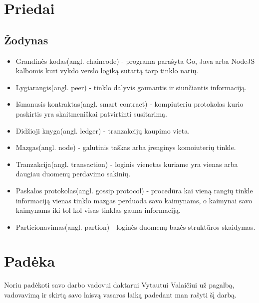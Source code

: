 \documentclass{VUMIFPSkursinis}
\begin{document}
\pagebreak

\section{Priedai}
\thispagestyle{empty} 
\subsection{Žodynas}
\begin{itemize}
	\item{Grandinės kodas(angl. chaincode) - programa parašyta Go, Java arba NodeJS kalbomis kuri vykdo
 verslo logiką sutartą tarp tinklo narių.}
	\item{Lygiarangis(angl. peer) - tinklo dalyvis gaunantis ir siunčiantis informaciją.}
	\item{Išmanusis kontraktas(angl. smart contract) - kompiuteriu protokolas kurio paskirtis yra skaitmeniškai patvirtinti susitarimą.}
	\item{Didžioji knyga(angl. ledger) - tranzakcijų kaupimo vieta.}
	\item{Mazgas(angl. node) - galutinis taškas arba įrenginys komoiuterių tinkle.}
	\item{Tranzakcija(angl. transaction) - loginis vienetas kuriame yra vienas arba daugiau duomenų perdavimo sakinių.}
	\item{Paskalos protokolas(angl. gossip protocol) - procedūra kai vieną rangių tinkle informaciją vienas tinklo mazgas perduoda savo kaimynams, o kaimynai savo kaimynams iki tol kol visas tinklas gauna informaciją.}
	\item{Particionavimas(angl. partion) - loginės duomenų bazės struktūros skaidymas.}
\end{itemize}

\section{Padėka}
	Noriu padėkoti savo darbo vadovui daktarui Vytautui Valaičiui už pagalbą, vadovavimą ir skirtą savo laisvą vasaros laiką padedant man rašyti šį darbą.
\thispagestyle{empty} 

\printbibliography[heading=bibintoc]  
\thispagestyle{empty} 
\end{document}
